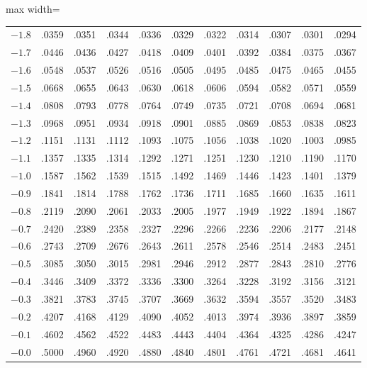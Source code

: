 \begin{center}
\begin{adjustbox}{max width=\linewidth}
\begin{tabular}{ccccccccccc}
$-1.8$ & .0359 & .0351 & .0344 & .0336 & .0329 & .0322 & .0314 & .0307 & .0301 & .0294 \\
$-1.7$ & .0446 & .0436 & .0427 & .0418 & .0409 & .0401 & .0392 & .0384 & .0375 & .0367 \\
$-1.6$ & .0548 & .0537 & .0526 & .0516 & .0505 & .0495 & .0485 & .0475 & .0465 & .0455 \\
$-1.5$ & .0668 & .0655 & .0643 & .0630 & .0618 & .0606 & .0594 & .0582 & .0571 & .0559 \\
\midrule
$-1.4$ & .0808 & .0793 & .0778 & .0764 & .0749 & .0735 & .0721 & .0708 & .0694 & .0681 \\
$-1.3$ & .0968 & .0951 & .0934 & .0918 & .0901 & .0885 & .0869 & .0853 & .0838 & .0823 \\
$-1.2$ & .1151 & .1131 & .1112 & .1093 & .1075 & .1056 & .1038 & .1020 & .1003 & .0985 \\
$-1.1$ & .1357 & .1335 & .1314 & .1292 & .1271 & .1251 & .1230 & .1210 & .1190 & .1170 \\
$-1.0$ & .1587 & .1562 & .1539 & .1515 & .1492 & .1469 & .1446 & .1423 & .1401 & .1379 \\
\midrule
$-0.9$ & .1841 & .1814 & .1788 & .1762 & .1736 & .1711 & .1685 & .1660 & .1635 & .1611 \\
$-0.8$ & .2119 & .2090 & .2061 & .2033 & .2005 & .1977 & .1949 & .1922 & .1894 & .1867 \\
$-0.7$ & .2420 & .2389 & .2358 & .2327 & .2296 & .2266 & .2236 & .2206 & .2177 & .2148 \\
$-0.6$ & .2743 & .2709 & .2676 & .2643 & .2611 & .2578 & .2546 & .2514 & .2483 & .2451 \\
$-0.5$ & .3085 & .3050 & .3015 & .2981 & .2946 & .2912 & .2877 & .2843 & .2810 & .2776 \\
\midrule
$-0.4$ & .3446 & .3409 & .3372 & .3336 & .3300 & .3264 & .3228 & .3192 & .3156 & .3121 \\
$-0.3$ & .3821 & .3783 & .3745 & .3707 & .3669 & .3632 & .3594 & .3557 & .3520 & .3483 \\
$-0.2$ & .4207 & .4168 & .4129 & .4090 & .4052 & .4013 & .3974 & .3936 & .3897 & .3859 \\
$-0.1$ & .4602 & .4562 & .4522 & .4483 & .4443 & .4404 & .4364 & .4325 & .4286 & .4247 \\
$-0.0$ & .5000 & .4960 & .4920 & .4880 & .4840 & .4801 & .4761 & .4721 & .4681 & .4641 \\
\bottomrule
\end{tabular}
\end{adjustbox}
\end{center}

